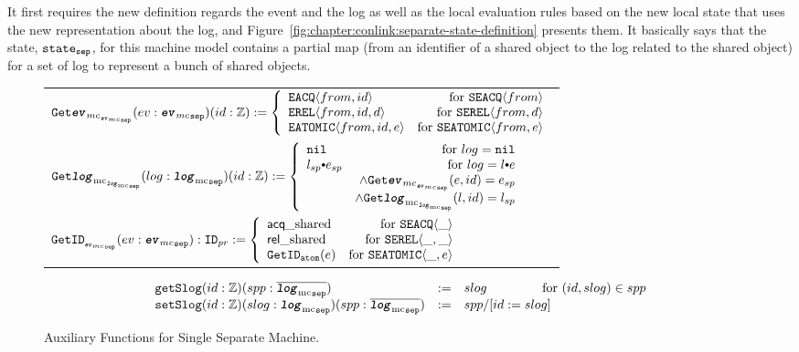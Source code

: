 It first requires the new definition regards the event and the log as well as 
the local evaluation rules based on the new local state that uses the new representation about the log,
and Figure~\ref{fig:chapter:conlink:separate-state-definition} presents them. 
It basically says that the state, ${{\mathrm{\texttt{state}}}_{{\mathrm{\texttt{sep}}}}}$, for this machine model contains a partial map (from an identifier of a shared object to the log related to the shared object) for a set of log to represent a bunch of shared objects.


\begin{figure}
\noindent{}
\begin{center}
\begin{tabular}{l}
$
   {{{\mathrm{\texttt{Get}}}{{\mathrm{\texttt{\textbf{\textit{ev}}}}}_{mc}}}_{_{{{{\mathrm{\texttt{\textbf{\textit{ev}}}}}_{mc}}_{{\mathrm{\texttt{sep}}}}}}}}(ev : {{{\mathrm{\texttt{\textbf{\textit{ev}}}}}_{mc}}_{{\mathrm{\texttt{sep}}}}}) (id : {\mathbb{Z}}) 
      :=  \left\{\begin{array}{lr}
        {{{\mathrm{\texttt{EACQ}}}}\langle{from}, {id}\rangle} & \text{for } {{{\mathrm{\texttt{SEACQ}}}}\langle{from}\rangle}\\
        {{{\mathrm{\texttt{EREL}}}}\langle{from}, {id}, {d}\rangle} & \text{for } {{{\mathrm{\texttt{SEREL}}}}\langle{from}, {d}\rangle}\\
        {{{\mathrm{\texttt{EATOMIC}}}}\langle{from}, {id}, {e}\rangle} & \text{for } {{{\mathrm{\texttt{SEATOMIC}}}}\langle{from},{e}\rangle} \\
        \end{array} \right.
$\\
$
   \separatelogtwologkwd(log : \separatelogtypekwd) (id : \ztype) 
      :=  \left\{\begin{array}{lr}
        \nulllist & \text{for } log = \nulllist \\
        \listconsoppo{e_{sp}}{l_{sp}} & \text{for }  log = \listconsoppo{e}{l} \\
        & \wedge \separateeventtwoevent{e}{id}{e_{sp}}\\
        & \wedge \separatelogtwolog{l}{id}{l_{sp}}\\
        \end{array} \right.
$\\
$
{{\mathrm{\texttt{Get}}}{\mathrm{\texttt{ID}}}_{_{{{{\mathrm{\texttt{\textbf{\textit{ev}}}}}_{mc}}_{{\mathrm{\texttt{sep}}}}}}}} (ev : {{{\mathrm{\texttt{\textbf{\textit{ev}}}}}_{mc}}_{{\mathrm{\texttt{sep}}}}}) : {{\mathrm{\texttt{ID}}}_{pr}} :=
 \left\{\begin{array}{lr}
         {\mbox{\textsf{acq}}\_\mbox{shared}}& \text{for } {{{\mathrm{\texttt{SEACQ}}}}\langle{\_}\rangle}\\
        {\mbox{\textsf{rel}}\_\mbox{shared}} & \text{for } {{{\mathrm{\texttt{SEREL}}}}\langle{\_}, {\_}\rangle}\\
        {{\mathrm{\texttt{GetID}}}_{{\mathrm{\texttt{atom}}}}({e})} & \text{for } {{{\mathrm{\texttt{SEATOMIC}}}}\langle{\_},{e}\rangle} \\
 \end{array} \right.
$\\
\end{tabular}
\end{center}
$$
\begin{array}{lll}
  \getseplogkwd (id :\ztype)(spp : \separatelogkwd)  &:= & slog\ \ \ \ \ \ \ \  \ \ \ \ \  \hfill{\text{for } (id, slog) \in spp}\\
   \setseplogkwd (id :\ztype) (slog : \separatelogtypekwd) (spp: \separatelogkwd) &:= &spp/[id := slog]\\
\end{array}
$$
\caption{Auxiliary Functions for Single Separate Machine.}
\label{fig:chapter:conlink:auxiliary-funcitons-for-single-separate-machine}
\end{figure}

